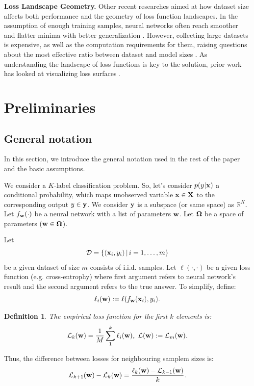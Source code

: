 \documentclass{article}
\newtheorem{definition}{Definition}
\begin{document}
\textbf{Loss Landscape Geometry.}
Other recent researches aimed at how dataset size affects both performance and the geometry of loss function landscapes.
In the assumption of enough training samples, neural networks often reach smoother and flatter minima with better
generalization \cite{wu2017towards}. However, collecting large datasets is expensive, as well as the computation
requirements for them, raising questions about the most effective ratio between dataset and model sizes
\cite{hoffmann2022training}. As understanding the landscape of loss functions is key to the solution, prior work has looked
at visualizing loss surfaces \cite{li2018visualizing}.

\section{Preliminaries}\label{sec:prelim}

\subsection{General notation}

In this section, we introduce the general notation used in the rest of the paper and the basic assumptions.

We consider a $K$-label classification problem.
So, let's consider $p(y|\mathbf{x})$ a conditional probability, which maps unobserved variable $\mathbf{x} \in \mathbf{X}$ to the corresponding
output $y \in \mathbf{y}$. We consider $\mathbf{y}$ is a subspace (or same space) as $\mathbb{R}^K$. Let $f_{\mathbf{w}}(\cdot)$
be a neural network with a list of parameters $\mathbf{w}$. Let $\boldsymbol{\Omega}$ be a space of parameters ($\mathbf{w} \in \boldsymbol{\Omega}$).

Let
$$\mathcal{D} = \left\{ (\mathbf{x}_i, y_i) \, | \, i = 1, \dots, m \right\}$$
be a given dataset of size $m$ consists of i.i.d.
samples. Let $\ell(\cdot, \cdot)$ be a given loss function (e.g. cross-entrophy) where first argument refers to neural network's
result and the second argument refers to the true answer. To simplify, define:
$$\ell_i(\mathbf{w}) := \ell(f_{\mathbf{w}}(\mathbf{x}_i), y_i).$$

\begin{definition}
  The empirical loss function for the first $k$ elements is:
  $$\mathcal{L}_k(\mathbf{w}) = \frac1M \sum\limits_1^k \ell_i(\mathbf{w}), \,\, \mathcal{L}(\mathbf{w}) := \mathcal{L}_m(\mathbf{w}).$$
\end{definition}

Thus, the difference between losses for neighbouring samplem sizes is:
$$\mathcal{L}_{k+1}(\mathbf{w}) - \mathcal{L}_{k}(\mathbf{w}) = \frac{\ell_{k}(\mathbf{w}) - \mathcal{L}_{k-1}(\mathbf{w})}{k}.$$
\end{document}
